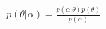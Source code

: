 \documentclass{standalone}
\begin{document}
$\displaystyle
p(θ|α) = \frac{p(α|θ)p(θ)}{p(α)}
$
\end{document}
